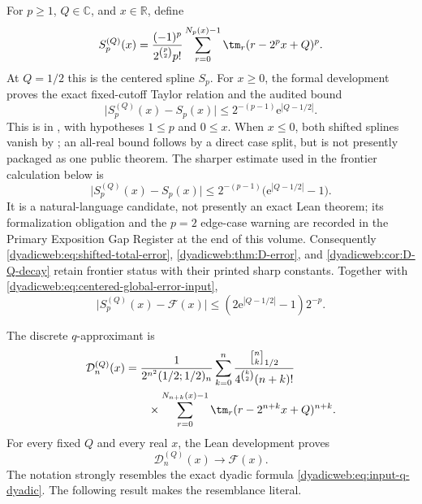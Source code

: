\documentclass[11pt,oneside]{article}
\theoremstyle{definition}
\theoremstyle{remark}
\newcommand{\R}{\mathbb R}
\newcommand{\C}{\mathbb C}
\newcommand{\e}{\mathrm e}
\newcommand{\qbinom}[3]{\genfrac{[}{]}{0pt}{}{#1}{#2}_{#3}}
\begin{document}
For $p\ge1$, $Q\in\C$, and $x\in\R$, define
\begin{equation}
 S_p^{(Q)}(x)=
 \frac{(-1)^p}{2^{\binom p2}p!}
 \sum_{r=0}^{N_p(x)-1}\tm_r(r-2^px+Q)^p.                  \label{dyadicweb:eq:shifted-spline-local}
\end{equation}
At $Q=1/2$ this is the centered spline $S_p$.  For $x\ge0$, the formal development proves
the exact fixed-cutoff Taylor relation and the audited bound
\begin{equation}
 \bigl|S_p^{(Q)}(x)-S_p(x)\bigr|
 \le2^{-(p-1)}\e^{|Q-1/2|}.                              \label{dyadicweb:eq:shifted-spline-bound-formal}
\end{equation}
This is  in
, with hypotheses $1\le p$ and $0\le x$.  When $x\le0$,
both shifted splines vanish by ; an all-real
bound follows by a direct case split, but is not presently packaged as one public theorem.
The sharper estimate used in the frontier calculation below is
\begin{equation}
 \bigl|S_p^{(Q)}(x)-S_p(x)\bigr|
 \le2^{-(p-1)}\bigl(\e^{|Q-1/2|}-1\bigr).                 \label{dyadicweb:eq:shifted-spline-bound-local}
\end{equation}
It is a natural-language candidate, not presently an exact Lean theorem; its formalization
obligation and the $p=2$ edge-case warning are recorded in the Primary Exposition Gap
Register at the end of this volume.  Consequently
\eqref{dyadicweb:eq:shifted-total-error}, \cref{dyadicweb:thm:D-error}, and
\cref{dyadicweb:cor:D-Q-decay} retain frontier status with their printed sharp constants.
Together with \eqref{dyadicweb:eq:centered-global-error-input},
\begin{equation}
 \bigl|S_p^{(Q)}(x)-\mathcal F(x)\bigr|
 \le(2\e^{|Q-1/2|}-1)2^{-p}.                              \label{dyadicweb:eq:shifted-total-error}
\end{equation}

The discrete $q$-approximant is
\begin{align}
 \mathcal D_n^{(Q)}(x)
 &=\frac1{2^{n^2}(1/2;1/2)_n}
 \sum_{k=0}^{n}
 \frac{\qbinom nk{1/2}}{4^{\binom k2}(n+k)!}             \notag\\
 &\qquad\times
 \sum_{r=0}^{N_{n+k}(x)-1}\tm_r
       (r-2^{n+k}x+Q)^{n+k}.                              \label{dyadicweb:eq:DnQ-local}
\end{align}
For every fixed $Q$ and every real $x$, the Lean development proves
\begin{equation}
 \mathcal D_n^{(Q)}(x)\longrightarrow\mathcal F(x).       \label{dyadicweb:eq:DnQ-limit-local}
\end{equation}
The notation strongly resembles the exact dyadic formula
\eqref{dyadicweb:eq:input-q-dyadic}.  The following result makes the resemblance literal.
\end{document}
